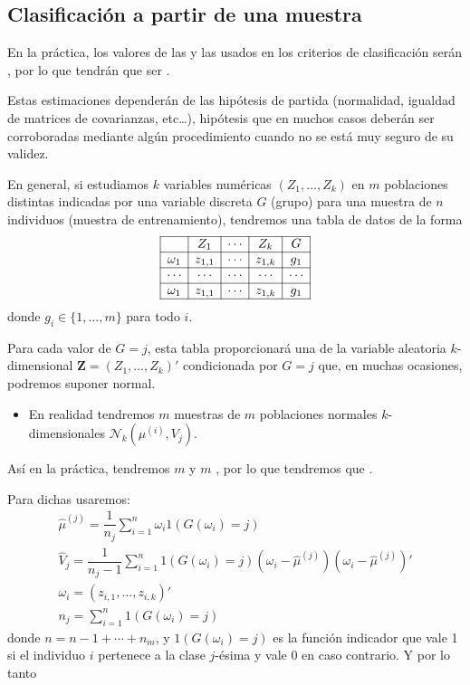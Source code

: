 \subsection{Clasificación a partir de una muestra}

En la práctica, los valores de las  y las  usados en los criterios de clasificación serán , por lo que tendrán que ser .

Estas estimaciones dependerán de las hipótesis de partida (normalidad, igualdad de matrices de covarianzas, etc…), hipótesis que en muchos casos deberán ser corroboradas mediante algún procedimiento cuando no se está muy seguro de su validez.

En general, si estudiamos $k$ variables numéricas $(Z_1,\dots,Z_k)$ en $m$ poblaciones distintas indicadas por una variable discreta $G$ (grupo) para una muestra de $n$ individuos (muestra de entrenamiento), tendremos una tabla de datos de la forma \[ \begin{array}{|c|c|c|c|c|}
\hline
 & Z_1 & \cdots & Z_k & G\\ \hline
 \omega_1 & z_{1,1} & \cdots & z_{1,k} & g_1 \\ \hline
 \cdots & \cdots & \cdots & \cdots & \cdots \\ \hline
 \omega_1 & z_{1,1} & \cdots & z_{1,k} & g_1 \\ \hline
\end{array} \]donde $g_i\in\{1,\dots, m\}$ para todo $i$.

Para cada valor de $G=j$, esta tabla proporcionará una \mas de la variable aleatoria $k$-dimensional $\mathbf{Z}=(Z_1,\dots,Z_k)'$ condicionada por $G=j$ que, en muchas ocasiones, podremos suponer normal.
\begin{itemize}
\item En realidad tendremos $m$ muestras de $m$ poblaciones normales $k$-dimensionales $\mathcal{N}_k(\mu^{(i)},V_j)$.
\end{itemize}
Así en la práctica, tendremos $m$  y $m$ , por lo que tendremos que .

Para dichas  usaremos: \[ \begin{array}{l}
\hat{\mu}^{(j)}=\dfrac{1}{n_j}\sum_{i=1}^{n}\omega_i1(G(\omega_i)=j)\\
\hat{V}_j=\dfrac{1}{n_j-1}\sum_{i=1}^{n}1(G(\omega_i)=j)(\omega_i-\hat{\mu}^{(j)})(\omega_i-\hat{\mu}^{(j)})'\\
\omega_i=(z_{i,1},\dots,z_{i,k})'\\
n_j=\sum_{i=1}^{n}1(G(\omega_i)=j)
\end{array} \]donde $n=n-1+\cdots+n_m$, y $1(G(\omega_i)=j)$ es la función indicador que vale 1 si el individuo $i$ pertenece a la clase $j$-ésima y vale 0 en caso contrario. Y por lo tanto